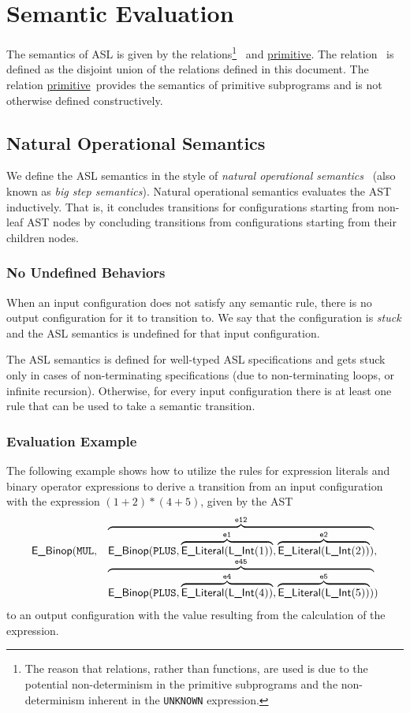 \documentclass{book}
\newcommand\primitiverel[0]{\hyperlink{def-primitiverel}{\textsf{primitive}}}
\newcommand\veone[0]{\texttt{e1}}
\newcommand\vetwo[0]{\texttt{e2}}
\newcommand\vefour[0]{\texttt{e4}}
\newcommand\vefive[0]{\texttt{e5}}
\newcommand\veonetwo[0]{\texttt{e12}}
\newcommand\vefourfive[0]{\texttt{e45}}
\begin{document}
\section{Semantic Evaluation}
\hypertarget{def-evalrel}{}
\hypertarget{def-primitiverel}{}
The semantics of ASL is given by the relations\footnote{The reason that relations, rather than functions, are used is due to the
potential non-determinism in the primitive subprograms
and the non-determinism inherent in the \texttt{UNKNOWN} expression.}
\evalrel\ and \primitiverel.
The relation \evalrel\ is defined as the disjoint union of the relations defined in this document.
The relation \primitiverel\ provides the semantics of primitive subprograms and is not otherwise defined
constructively.

\subsection{Natural Operational Semantics}
We define the ASL semantics in the style of \emph{natural operational semantics}~\cite{SemanticsWithApplicationsBook}
(also known as \emph{big step semantics}).
Natural operational semantics evaluates the AST inductively.
That is, it concludes transitions for configurations starting from
non-leaf AST nodes by concluding transitions from configurations starting from their children nodes.

\subsubsection{No Undefined Behaviors}
When an input configuration does not satisfy any semantic rule,
there is no output configuration for it to transition to. We say that
the configuration is \emph{stuck} and the ASL semantics is undefined for that
input configuration.

The ASL semantics is defined for well-typed ASL specifications
and gets stuck only in cases of non-terminating specifications
(due to non-terminating loops, or infinite recursion).
Otherwise, for every input configuration there is at least one rule that can be used to take a semantic transition.

\hypertarget{eval-example}{}
\subsubsection{Evaluation Example}
\newcommand\elint[1]{\ELiteral(\lint(#1))}
The following example shows how to utilize the rules for expression literals and binary operator expressions
to derive a transition from an input configuration with the expression $(1+2)*(4+5)$,
given by the AST
\[
  \begin{array}{rl}
  \EBinop(\MUL, &\overname{\EBinop(\PLUS, \overname{\elint{1}}{\veone}, \overname{\elint{2}}{\vetwo})}{\veonetwo}, \\
                &\overname{\EBinop(\PLUS, \overname{\elint{4}}{\vefour}, \overname{\elint{5}}{\vefive})}{\vefourfive})
  \end{array}
\]
to an output configuration with the value resulting from the calculation of the expression.
\end{document}
